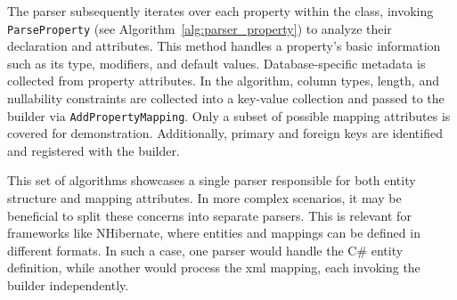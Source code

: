 The parser subsequently iterates over each property within the class, invoking \texttt{ParseProperty} (see Algorithm~\ref{alg:parser_property}) to analyze their declaration and attributes. This method handles a property's basic information such as its type, modifiers, and default values. Database-specific metadata is collected from property attributes. In the algorithm, column types, length, and nullability constraints are collected into a key-value collection and passed to the builder via \texttt{AddPropertyMapping}. Only a subset of possible mapping attributes is covered for demonstration. Additionally, primary and foreign keys are identified and registered with the builder.



This set of algorithms showcases a single parser responsible for both entity structure and mapping attributes. In more complex scenarios, it may be beneficial to split these concerns into separate parsers. This is relevant for frameworks like NHibernate, where entities and mappings can be defined in different formats. In such a case, one parser would handle the C\# entity definition, while another would process the \acrshort{xml} mapping, each invoking the builder independently. 

